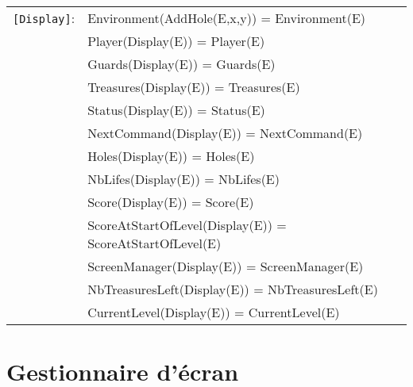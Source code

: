 \documentclass[7pt]{article}
\begin{document}
\begin{tabular}{rl}
       \texttt{[Display]}: & Environment(AddHole(E,x,y)) = Environment(E) \\
       & Player(Display(E)) = Player(E) \\
       & Guards(Display(E)) = Guards(E) \\
       & Treasures(Display(E)) = Treasures(E) \\
       & Status(Display(E)) = Status(E) \\
       & NextCommand(Display(E)) = NextCommand(E) \\
       & Holes(Display(E)) = Holes(E) \\
       & NbLifes(Display(E)) = NbLifes(E) \\
       & Score(Display(E)) = Score(E) \\
       & ScoreAtStartOfLevel(Display(E)) = ScoreAtStartOfLevel(E) \\
       & ScreenManager(Display(E)) = ScreenManager(E) \\
       & NbTreasuresLeft(Display(E)) = NbTreasuresLeft(E) \\
       & CurrentLevel(Display(E)) = CurrentLevel(E) \\

\end{tabular}
\newpage

\section*{Gestionnaire d'écran}
\end{document}
